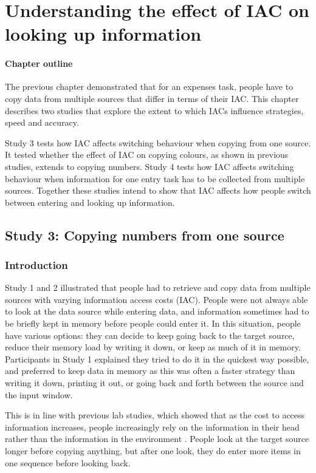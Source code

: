 \chapter{Understanding the effect of IAC on looking up information}

\begin{mynote}
\subsubsection{Chapter outline}
The previous chapter demonstrated that for an expenses task, people have to copy data from multiple sources that differ in terms of their IAC. This chapter describes two studies that explore the extent to which IACs influence strategies, speed and accuracy. 

Study 3 tests how IAC affects switching behaviour when copying from one source. It tested whether the effect of IAC on copying colours, as shown in previous studies, extends to copying numbers. Study 4 tests how IAC affects switching behaviour when information for one entry task has to be collected from multiple sources.
Together these studies intend to show that IAC affects how people switch between entering and looking up information.

\end{mynote}

 
\section{Study 3: Copying numbers from one source}\label{ch:Study2}
\subsection{Introduction}
Study 1 and 2 illustrated that people had to retrieve and copy data from multiple sources with varying information access costs (IAC). People were not always able to look at the data source while entering data, and information sometimes had to be briefly kept in memory before people could enter it.
In this situation, people have various options: they can decide to keep going back to the target source, reduce their memory load by writing it down, or keep as much of it in memory. Participants in Study 1 explained they tried to do it in the quickest way possible, and preferred to keep data in memory as this was often a faster strategy than writing it down, printing it out, or going back and forth between the source and the input window.

This is in line with previous lab studies, which showed that as the cost to access information increases, people increasingly rely on the information in their head rather than the information in the environment \citep[e.g.][]{Gray2006, Morgan2009}. People look at the target source longer before copying anything, but after one look, they do enter more items in one sequence before looking back. 

